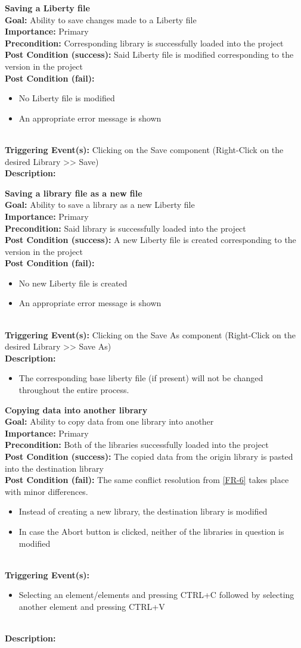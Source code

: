 \documentclass[10pt,a4paper]{report}
\newcommand{\FRDescription}[8]{
    \textbf{#1} \leavevmode \\
    \textbf{Goal: } #2 \leavevmode \\
    \textbf{Importance: } #3 \leavevmode \\
    \textbf{Precondition: } #4 \leavevmode \\
    \textbf{Post Condition (success): } #5 \leavevmode \\
    \textbf{Post Condition (fail): } #6 \leavevmode \\
    \textbf{Triggering Event(s): } #7 \leavevmode \\
    \textbf{Description: } \leavevmode \\ 
    #8}
\begin{document}
\begin{FR}
{\begin{itemize}
    \end{itemize}}
    \item \FRDescription{Saving a Liberty file}
    {Ability to save changes made to a Liberty file}
    {Primary}
    {Corresponding library is successfully loaded into the project}
    {Said Liberty file is modified corresponding to the version in the project}
    {\begin{itemize}
        \item No Liberty file is modified
        \item An appropriate error message is shown
    \end{itemize}}
    {Clicking on the Save component (Right-Click on the desired Library  >> Save)}
    \item \FRDescription{Saving a library file as a new file}
    {Ability to save a library as a new Liberty file}
    {Primary}
    {Said library is successfully loaded into the project}
    {A new Liberty file is created corresponding to the version in the project}
    {\begin{itemize}
        \item No new Liberty file is created
        \item An appropriate error message is shown
    \end{itemize}}
    {Clicking on the Save As component (Right-Click on the desired Library  >> Save As)}
    {\begin{itemize}
        \item The corresponding base liberty file (if present) will not be changed throughout the entire process.
    \end{itemize}}
    \item \FRDescription{Copying data into another library}
    {Ability to copy data from one library into another}
    {Primary}
    {Both of the libraries successfully loaded into the project}
    {The copied data from the origin library is pasted into the destination library}
    {The same conflict resolution from \ref{FR-6} takes place with minor differences.
    \begin{itemize}
        \item Instead of creating a new library, the destination library is modified
        \item In case the Abort button is clicked, neither of the libraries in question is modified
    \end{itemize}}
    {\begin{itemize}
        \item Selecting an element/elements and pressing CTRL+C followed by selecting another element and pressing CTRL+V

\end{itemize}}
\end{FR}
\end{document}
